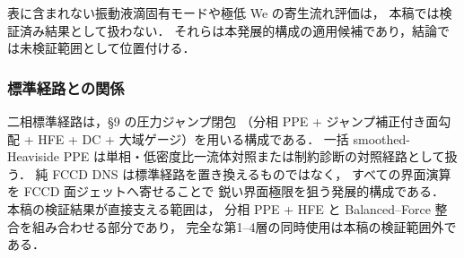 表に含まれない振動液滴固有モードや極低 We の寄生流れ評価は，
本稿では検証済み結果として扱わない．
それらは本発展的構成の適用候補であり，結論では未検証範囲として位置付ける．

\subsubsection{標準経路との関係}
\label{sec:pure_fccd_roadmap}

二相標準経路は，§9 の圧力ジャンプ閉包
（分相 PPE + ジャンプ補正付き面勾配 + HFE + DC + 大域ゲージ）を用いる構成である．
一括 smoothed-Heaviside PPE は単相・低密度比一流体対照または制約診断の対照経路として扱う．
純 FCCD DNS は標準経路を置き換えるものではなく，
すべての界面演算を FCCD 面ジェットへ寄せることで
鋭い界面極限を狙う発展的構成である．
本稿の検証結果が直接支える範囲は，
分相 PPE + HFE と Balanced--Force 整合を組み合わせる部分であり，
完全な第1--4層の同時使用は本稿の検証範囲外である．

